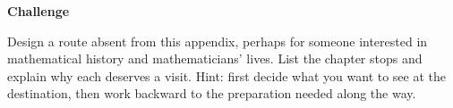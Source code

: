 \textbf{Challenge}
\begin{sikao}
\item Design a route absent from this appendix, perhaps for someone interested in mathematical history and mathematicians' lives. List the chapter stops and explain why each deserves a visit. Hint: first decide what you want to see at the destination, then work backward to the preparation needed along the way.
\end{sikao}
